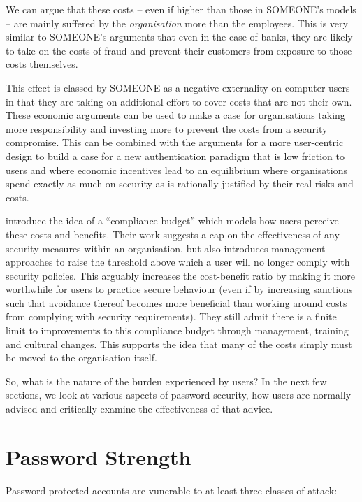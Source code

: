 \documentclass{report}
\begin{document}
We can argue that these costs -- even if higher than those
in SOMEONE's models -- are mainly suffered by the \emph{organisation}
more than the employees. This is very similar to SOMEONE's
arguments that even in the case of banks, they are likely
to take on the costs of fraud and prevent their customers
from exposure to those costs themselves.

This effect is classed
by SOMEONE as a negative externality on computer users in
that they are taking on additional effort to cover costs
that are not their own. These economic arguments can be
used to make a case for organisations taking more
responsibility and investing more to prevent the costs
from a security compromise. This can be combined with
the arguments for a more user-centric design
\parencite{adams1999users} to build a case for a new
authentication paradigm that is low friction to users and
where economic incentives lead to an equilibrium where
organisations spend exactly as much on security as
is rationally justified by their real risks and costs.

\cite{beautement2009compliance} introduce the idea of a
``compliance budget'' which models how users perceive these costs
and benefits. Their work suggests a cap on the effectiveness of any
security measures within an organisation, but also introduces management
approaches to raise the threshold above which a user will no longer
comply with security policies. This arguably increases the cost-benefit
ratio by making it more worthwhile for users to practice secure
behaviour (even if by increasing sanctions such that avoidance thereof becomes
more beneficial than working around costs from complying with security
requirements). They still admit there is a finite limit to improvements to
this compliance budget through management, training and cultural changes.
This supports the idea that many of the costs simply must be moved to the
organisation itself.

So, what is the nature of the burden experienced by users?
In the next few sections, we look at various aspects
of password security, how users are normally advised
and critically examine the effectiveness of that advice.

\section{Password Strength}
\label{sec:strength}

Password-protected accounts are vunerable to at least three
classes of attack\parencite{florencio2014password}:
\end{document}
